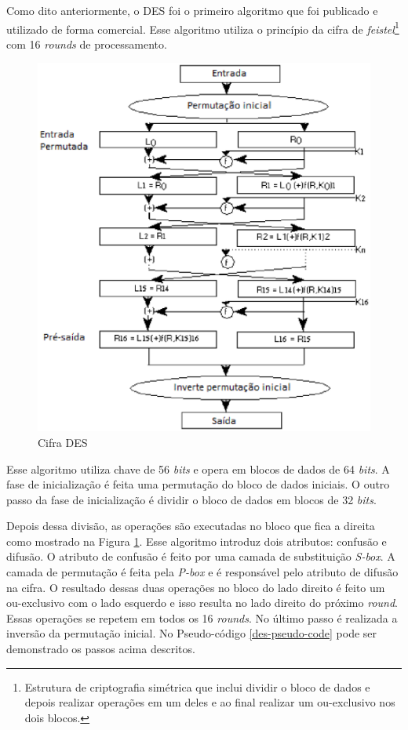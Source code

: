 Como dito anteriormente, o DES foi o primeiro algoritmo que foi publicado e utilizado de forma comercial. Esse algoritmo utiliza o princípio da cifra de \textit{feistel}\footnote{Estrutura de criptografia simétrica que inclui dividir o bloco de dados e depois realizar operações em um deles e ao final realizar um ou-exclusivo nos dois blocos.} com 16 \textit{rounds} de processamento.

\begin{figure}[h]
	\centering
	\includegraphics[scale=0.8]
		{figuras/des_cipher.eps}
		\caption[Cifra \textit{DES}]{Cifra DES\protect\footnotemark} 
		\label{cifra-des}
\end{figure}

Esse algoritmo utiliza chave de 56 \textit{bits} e opera em blocos de dados de 64 \textit{bits}. A fase de inicialização é feita uma permutação do bloco de dados iniciais. O outro passo da fase de inicialização é dividir o bloco de dados em blocos de 32 \textit{bits}. 

Depois dessa divisão, as operações são executadas no bloco que fica a direita como mostrado na Figura \ref{cifra-des}. Esse algoritmo introduz dois atributos: confusão e difusão. O atributo de confusão é feito por uma camada de substituição \textit{S-box}. A camada de permutação é feita pela \textit{P-box} e é responsável pelo atributo de difusão na cifra. O resultado dessas duas operações no bloco do lado direito é feito um ou-exclusivo com o lado esquerdo e isso resulta no lado direito do próximo \textit{round}. Essas operações se repetem em todos os 16 \textit{rounds}. No último passo é realizada a inversão da permutação inicial. No Pseudo-código \ref{des-pseudo-code} pode ser demonstrado os passos acima descritos.

